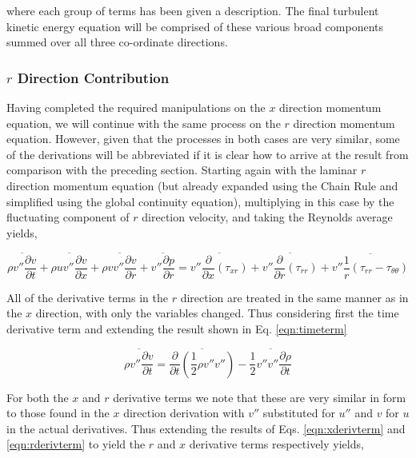 	where each group of terms has been given a description.  The final turbulent kinetic energy equation
will be comprised of these various broad components summed over all three co-ordinate directions. 

\subsubsection{$r$ Direction Contribution}

	Having completed the required manipulations on the $x$ direction momentum equation, we will continue with the 
same process on the $r$ direction momentum equation.  However, given that the processes in both cases are very similar,
some of the derivations will be abbreviated if it is clear how to arrive at the result from comparison with the preceding
section.  Starting again with the laminar $r$ direction momentum equation (but already expanded using the Chain Rule and
simplified using the global continuity equation), multiplying in this case by the fluctuating component of $r$ direction
velocity, and taking the Reynolds average yields,

\begin{equation}
	\overline{\rho v'' \frac{\partial v}{\partial t}} + \overline{\rho u v'' \frac{\partial v}{\partial x}} 
	+ \overline{\rho v v'' \frac{\partial v}{\partial r}}  + \overline{v''\frac{\partial p}{\partial r}} 
	= \overline{v''\frac{\partial}{\partial x}(\tau_{xr})} + \overline{v''\frac{\partial}{\partial r}(\tau_{rr})} 
	 + \overline{v''\frac{1}{r}(\tau_{rr} - \tau_{\theta \theta})}
\label{eqn:vrmomshear}
\end{equation}

	All of the derivative terms in the $r$ direction are treated in the same manner as in the $x$ direction, with
only the variables changed.  Thus considering first the time derivative term and extending the result shown in 
Eq. \ref{eqn:timeterm}	

\begin{equation}
	\overline{\rho v'' \frac{\partial v}{\partial t}} = \overline{\frac{\partial}{\partial t}
	(\frac{1}{2}\rho v'' v'')} - \overline{\frac{1}{2}v''v''\frac{\partial \rho}{\partial t}}	
\label{eqn:timeterm2}
\end{equation}

	For both the $x$ and $r$ derivative terms we note that these are very similar in form to those found
in the $x$ direction derivation with $v''$ substituted for $u''$ and $v$ for $u$ in the actual derivatives.  Thus
extending the results of Eqs. \ref{eqn:xderivterm} and \ref{eqn:rderivterm} to yield the $r$ and $x$ derivative terms 
respectively yields,

